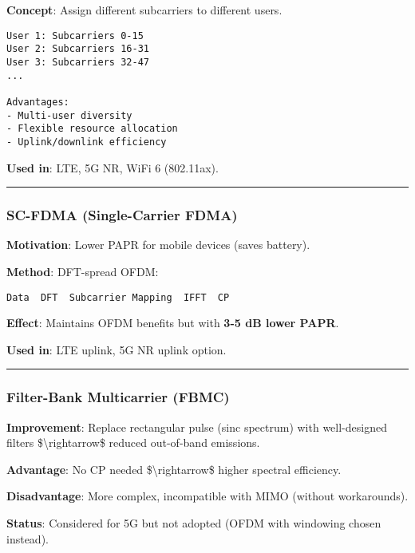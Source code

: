 \textbf{Concept}: Assign different subcarriers to different users.

\begin{verbatim}
User 1: Subcarriers 0-15
User 2: Subcarriers 16-31
User 3: Subcarriers 32-47
...

Advantages:
- Multi-user diversity
- Flexible resource allocation
- Uplink/downlink efficiency
\end{verbatim}

\textbf{Used in}: LTE, 5G NR, WiFi 6 (802.11ax).

\begin{center}\rule{0.5\linewidth}{0.5pt}\end{center}

\subsubsection{SC-FDMA (Single-Carrier
FDMA)}\label{sc-fdma-single-carrier-fdma}

\textbf{Motivation}: Lower PAPR for mobile devices (saves battery).

\textbf{Method}: DFT-spread OFDM:

\begin{verbatim}
Data  DFT  Subcarrier Mapping  IFFT  CP
\end{verbatim}

\textbf{Effect}: Maintains OFDM benefits but with \textbf{3-5 dB lower
PAPR}.

\textbf{Used in}: LTE uplink, 5G NR uplink option.

\begin{center}\rule{0.5\linewidth}{0.5pt}\end{center}

\subsubsection{Filter-Bank Multicarrier
(FBMC)}\label{filter-bank-multicarrier-fbmc}

\textbf{Improvement}: Replace rectangular pulse (sinc spectrum) with
well-designed filters \$\textbackslash rightarrow\$ reduced out-of-band
emissions.

\textbf{Advantage}: No CP needed \$\textbackslash rightarrow\$ higher
spectral efficiency.

\textbf{Disadvantage}: More complex, incompatible with MIMO (without
workarounds).

\textbf{Status}: Considered for 5G but not adopted (OFDM with windowing
chosen instead).

